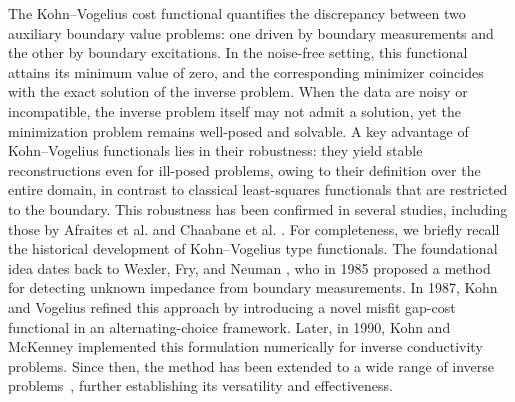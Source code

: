\documentclass[a4paper,12pt,reqno,natbib]{amsart}
\begin{document}
The Kohn--Vogelius cost functional quantifies the discrepancy between two auxiliary boundary value problems: one driven by boundary measurements and the other by boundary excitations. In the noise-free setting, this functional attains its minimum value of zero, and the corresponding minimizer coincides with the exact solution of the inverse problem. When the data are noisy or incompatible, the inverse problem itself may not admit a solution, yet the minimization problem remains well-posed and solvable. A key advantage of Kohn--Vogelius functionals lies in their robustness: they yield stable reconstructions even for ill-posed problems, owing to their definition over the entire domain, in contrast to classical least-squares functionals that are restricted to the boundary. This robustness has been confirmed in several studies, including those by Afraites et al. \cite{afraites2007detecting,afraites2006conformal} and Chaabane et al. \cite{chaabane2004stable}. For completeness, we briefly recall the historical development of Kohn--Vogelius type functionals. The foundational idea dates back to Wexler, Fry, and Neuman \cite{WexlerAO1985}, who in 1985 proposed a method for detecting unknown impedance from boundary measurements. In 1987, Kohn and Vogelius \cite{KohnCPAM1984} refined this approach by introducing a novel misfit gap-cost functional in an alternating-choice framework. Later, in 1990, Kohn and McKenney \cite{KohnIP1990} implemented this formulation numerically for inverse conductivity problems. Since then, the method has been extended to a wide range of inverse problems~\cite{abda2009topological,abda2019topological,abda2013recovering, aspri2022phase,CanelasIP2015,caubet2019data,eppler2005regularized,hrizi2019reconstruction,kahlaoui2025non,oulmelk2023inverse,prakash2021noniterative,roche1997numerical}, further establishing its versatility and effectiveness.
\end{document}
